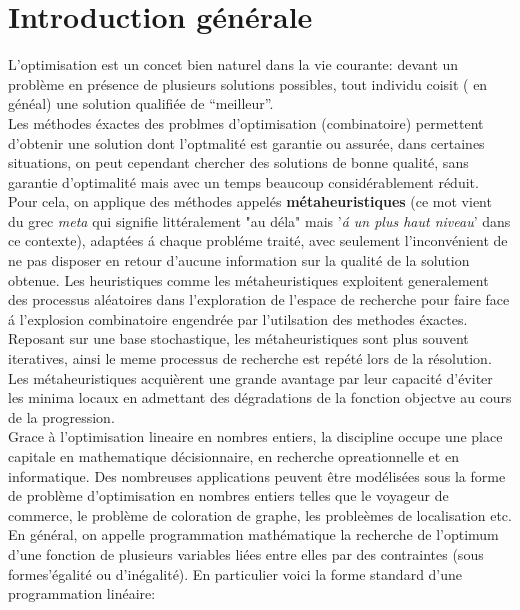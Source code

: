 \documentclass[a4paper,11pt,oneside]{report}
\theoremstyle{plain}
\newcommand{\0}{/ \! \! \! 0}
\theoremstyle{plain}
\begin{document}
\tableofcontents
\listoffigures
\listoftables


\chapter*{Introduction g\'en\'erale}

L'optimisation est un concet bien naturel dans la vie courante: devant un probl\`eme en pr\'esence de plusieurs solutions possibles, tout individu
coisit ( en g\'en\'eal) une solution qualifi\'ee de ``meilleur''.\\
Les m\'ethodes \'exactes des problmes d'optimisation (combinatoire) permettent d'obtenir une solution dont l'optmalit\'e est garantie ou assur\'ee, 
dans certaines situations, on peut cependant chercher des solutions de bonne qualit\'e, sans garantie d'optimalit\'e mais avec un temps beaucoup 
consid\'erablement r\'eduit. Pour cela, on applique des m\'ethodes appel\'es  {\bf m\'etaheuristiques}  (ce mot vient du grec {\it meta} qui signifie 
litt\'eralement "au d\'ela" mais '{\it \'a un plus haut niveau}' dans ce contexte), adapt\'ees \'a chaque probl\'eme trait\'e, avec seulement
l'inconv\'enient de ne 
pas disposer en retour d'aucune information sur la qualit\'e de la solution obtenue. Les heuristiques comme les m\'etaheuristiques exploitent
generalement des
 processus al\'eatoires dans l'exploration de l'espace de recherche pour faire face \'a l'explosion combinatoire engendr\'ee par l'utilsation des methodes \'exactes. 
 Reposant sur une base stochastique, les m\'etaheuristiques sont plus souvent iteratives, ainsi le meme processus de recherche est rep\'et\'e lors de la r\'esolution.
 Les m\'etaheuristiques acqui\`erent une grande avantage par leur capacit\'e d'\'eviter les minima locaux en admettant des d\'egradations de la fonction objectve au
 cours de la progression.\\
 Grace \`a l'optimisation lineaire en nombres entiers, la discipline occupe une place capitale en mathematique d\'ecisionnaire, en recherche opreationnelle et en informatique.
 Des nombreuses applications peuvent \^etre mod\'elis\'ees sous la forme de probl\`eme d'optimisation en nombres entiers telles que le voyageur de commerce, le probl\`eme
 de coloration de graphe, les proble\`emes de localisation etc.
 En g\'en\'eral, on appelle programmation math\'ematique la recherche de l'optimum d'une fonction de plusieurs variables li\'ees entre elles
  par des contraintes (sous formes'\'egalit\'e ou d'in\'egalit\'e). En particulier voici la forme standard d'une programmation lin\'eaire:
\end{document}
